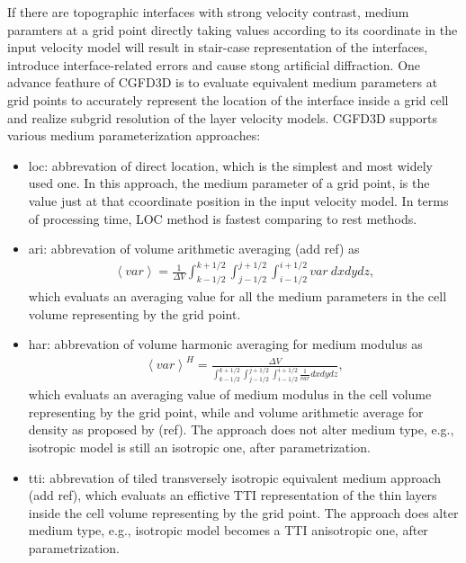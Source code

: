 If there are topographic interfaces with strong velocity contrast, 
medium paramters at a grid point directly taking values according to its coordinate in the input velocity model
 will result in stair-case representation of the interfaces, introduce interface-related errors and cause stong artificial diffraction.
One advance feathure of CGFD3D is to evaluate equivalent medium parameters at grid points 
to accurately represent the location of the interface inside a grid cell 
and realize subgrid resolution of the layer velocity models.
CGFD3D supports various medium parameterization approaches:
\begin{itemize}
\item loc: abbrevation of direct location, which is the simplest and most widely used one. 
      In this approach, the medium parameter of a grid point,
      is the value just at that ccoordinate position
      in the input velocity model. In terms of processing time,
      LOC method is fastest comparing to rest methods.
\item ari: abbrevation of volume arithmetic averaging (add ref) as
  \begin{align}
    \left<var\right> = \frac{1}{\Delta V} 
            \int_{k-1/2}^{k+1/2} \int_{j-1/2}^{j+1/2} \int_{i-1/2}^{i+1/2} var~dx dy dz,
  \end{align}
  which evaluats an averaging value for all the medium parameters
    in the cell volume representing by the grid point.
\item har: abbrevation of volume harmonic averaging for medium modulus as 
  \begin{align}
    \left<var\right>^H = \frac{\Delta V}
      {\int_{k-1/2}^{k+1/2} \int_{j-1/2}^{j+1/2} \int_{i-1/2}^{i+1/2} \frac{1}{var} dx dy dz},
  \end{align}
  which evaluats an averaging value of medium modulus in the cell volume representing by the grid point,
  while and volume arithmetic average for density as proposed by (ref).
  The approach does not alter medium type,
    e.g., isotropic model is still an isotropic one, after parametrization.
\item tti: abbrevation of tiled transversely isotropic equivalent medium approach (add ref), 
        which evaluats an effictive TTI representation of the thin layers inside the cell volume representing by the grid point.
        The approach does alter medium type, e.g., isotropic model becomes a TTI anisotropic one, after parametrization.
\end{itemize}


